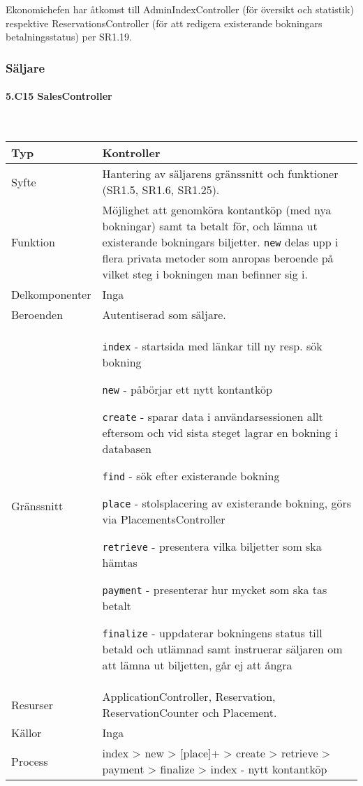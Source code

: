 \documentclass[a4paper, twoside, 11pt, titlepage]{article}
\begin{document}
		Ekonomichefen har åtkomst till AdminIndexController (för översikt och statistik) respektive ReservationsController (för att redigera existerande bokningars betalningsstatus) per SR1.19.

		\subsubsection{Säljare}



			\paragraph{5.C15 SalesController}\

			\begin {table} [ht] \begin{tabular} {  p{3.5cm} p{9.6cm} }
				\hline
				{Typ} & {Kontroller} \\
				\hline
				{Syfte} & {Hantering av säljarens gränssnitt och funktioner (SR1.5, SR1.6, SR1.25).} \\
				\hline
				{Funktion} & {Möjlighet att genomköra kontantköp (med nya bokningar) samt ta betalt för, och lämna ut existerande bokningars biljetter. {\tt new} delas upp i flera privata metoder som anropas beroende på vilket steg i bokningen man befinner sig i.} \\
				\hline
				{Delkomponenter} & {Inga} \\
				\hline
				{Beroenden} & {Autentiserad som säljare.} \\
				\hline
				{Gränssnitt} & {{\tt index} - startsida med länkar till ny resp. sök bokning

{\tt new} - påbörjar ett nytt kontantköp

{\tt create} - sparar data i användarsessionen allt eftersom och vid sista steget lagrar en bokning i databasen

{\tt find} - sök efter existerande bokning

{\tt place} - stolsplacering av existerande bokning, görs via PlacementsController

{\tt retrieve} - presentera vilka biljetter som ska hämtas

{\tt payment} - presenterar hur mycket som ska tas betalt

{\tt finalize} - uppdaterar bokningens status till betald och utlämnad samt instruerar säljaren om att lämna ut biljetten, går ej att ångra} \\
				\hline
				{Resurser} & {ApplicationController, Reservation, ReservationCounter och Placement.} \\
				\hline
				{Källor} & {Inga} \\
				\hline
				{Process} & {index > new > [place]+ > create > retrieve > payment > finalize > index - nytt kontantköp

}
\end{tabular}
\end{table}
\end{document}
